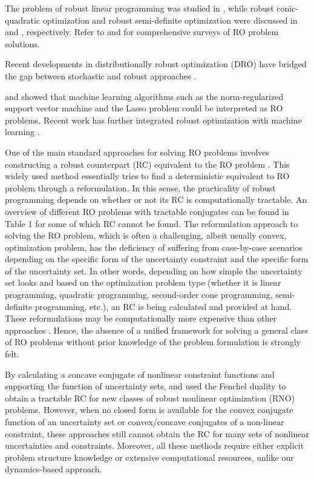 \documentclass[journal,twoside,web]{ieeecolor}
\newcommand{\rev}[1]{\textcolor{revisionblue}{#1}}
\begin{document}
The problem of robust linear programming was studied in \cite{bental1999}, while robust conic-quadratic optimization and robust semi-definite optimization were discussed in \cite{bental2002} and \cite{bental1998}, respectively. Refer to \cite{bertsimas2011} and \cite{beyer2007} for \rev{comprehensive} surveys of RO problem solutions.

\rev{Recent developments in distributionally robust optimization (DRO) have bridged the gap between stochastic and robust approaches \cite{aigner2023,yang2023}.}

\cite{xu2009} and \cite{xu2010} showed that machine learning algorithms such as the norm-regularized support vector machine and the Lasso problem could be interpreted as RO problems. \rev{Recent work has further integrated robust optimization with machine learning \cite{zhu2023zeroth,madry2018adversarial}.}

One of the main standard approaches for solving RO problems involves constructing a robust counterpart (RC) equivalent to the RO problem \cite{bental2009}. This widely used method essentially tries to find a deterministic equivalent to RO problem through a reformulation. In this sense, the practicality of robust programming depends on whether or not its RC is computationally tractable. An overview of different RO problems with tractable conjugates can be found in \cite{gorissen20152} Table 1 for some of which RC cannot be found.
The reformulation approach to solving the RO problem, which is often a challenging, albeit usually convex, optimization problem, has the deficiency of suffering from case-by-case scenarios depending on the specific form of the uncertainty constraint and the specific form of the uncertainty set. In other words, depending on how simple the uncertainty set looks and based on the optimization problem type (whether it is linear programming, quadratic programming, second-order cone programming, semi-definite programming, etc.), an RC is being calculated and provided at hand. These reformulations may be computationally more expensive than other approaches \cite{bertsimas2016}. Hence, the absence of a unified framework for solving a general class of RO problems without prior knowledge of the problem formulation is strongly felt.

By calculating a concave conjugate of nonlinear constraint functions and supporting the function of uncertainty sets, \cite{bental20152} and \cite{gorissen20152} used the Fenchel duality to obtain a tractable RC for new classes of robust nonlinear optimization (RNO) problems. However, when no closed form is available for the convex conjugate function of an uncertainty set or convex/concave conjugates of a non-linear constraint, these approaches still cannot obtain the RC for many sets of nonlinear uncertainties and constraints. \rev{Moreover, all these methods require either explicit problem structure knowledge or extensive computational resources, unlike our dynamics-based approach.}
\end{document}
